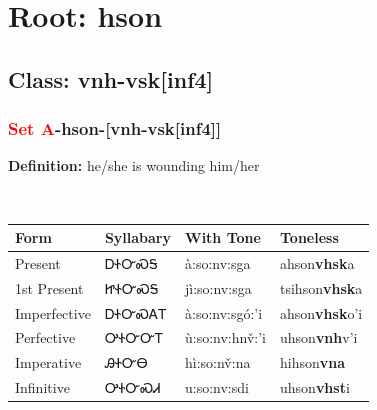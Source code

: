 \needspace{4in}
\section*{Root: hson}
\nopagebreak
{}
\needspace{3in}
\subsection*{Class: vnh-vsk[inf4]}
\nopagebreak
\needspace{2in}
\subsubsection*{\textcolor{Red}{Set A}{-}\textbf{hson}{-}[vnh-vsk[inf4]]}
\nopagebreak
\textbf{Definition: } he/she is wounding him/her
\\[0.5em]
\begin{tabularx}{\textwidth}{l X X X}%
\toprule%
\textbf{Form}&\textbf{Syllabary}&\textbf{With Tone}&\textbf{Toneless}\\%
\midrule%
Present&ᎠᏐᏅᏍᎦ&à:so:nv:sga&ahson\textbf{vhsk}a\\%
1st Present&ᏥᏐᏅᏍᎦ&jì:so:nv:sga&tsihson\textbf{vhsk}a\\%
Imperfective&ᎠᏐᏅᏍᎪᎢ&à:so:nv:sgó:’i&ahson\textbf{vhsk}o'i\\%
Perfective&ᎤᏐᏅᏅᎢ&ù:so:nv:hnv̌:’i&uhson\textbf{vnh}v'i\\%
Imperative&ᎯᏐᏅᎾ&hì:so:nv̌:na&hihson\textbf{vna}\\%
Infinitive&ᎤᏐᏅᏍᏗ&u:so:nv:sdi&uhson\textbf{vhst}i\\%
\bottomrule%
\end{tabularx}
\\[1em]